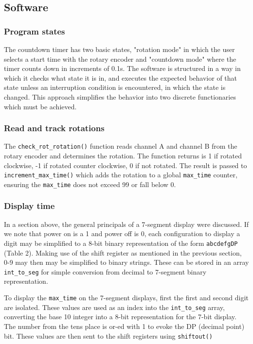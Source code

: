 \documentclass[fleqn]{article}
\begin{document}
\subsection*{Software}
\subsubsection*{Program states}
The countdown timer has two basic states, "rotation mode" in which the user selects a start time with the rotary encoder and "countdown mode" where the timer counts down in increments of 0.1s. The software is structured in a way in which it checks what state it is in, and executes the expected behavior of that state unless an interruption condition is encountered, in which the state is changed. This approach simplifies the behavior into two discrete functionaries which must be achieved.

\subsubsection*{Read and track rotations}
The \verb|check_rot_rotation()| function reads channel A and channel B from the rotary encoder and determines the rotation. The function returns is 1 if rotated clockwise, -1 if rotated counter clockwise, 0 if not rotated. The result is passed to \verb|increment_max_time()| which adds the rotation to a global \verb|max_time| counter, ensuring the \verb|max_time| does not exceed 99 or fall below 0.

\subsubsection*{Display time}
In a section above, the general principals of a 7-segment display were discussed. If we note that power on is a 1 and power off is 0, each configuration to display a digit may be simplified to a 8-bit binary representation of the form \verb|abcdefgDP| (Table 2). Making use of the shift register as mentioned in the previous section, 0-9 may then may be simplified to binary strings. These can be stored in an array \verb|int_to_seg| for simple conversion from decimal to 7-segment binary representation.

\vspace*{0.15cm}
To display the \verb|max_time| on the 7-segment displays, first the first and second digit are isolated. These values are used as an index into the \verb|int_to_seg| array, converting the base 10 integer into a 8-bit representation for the 7-bit display. The number from the tens place is or-ed with 1 to evoke the DP (decimal point) bit. These values are then sent to the shift registers using \verb|shiftout()|
\end{document}
